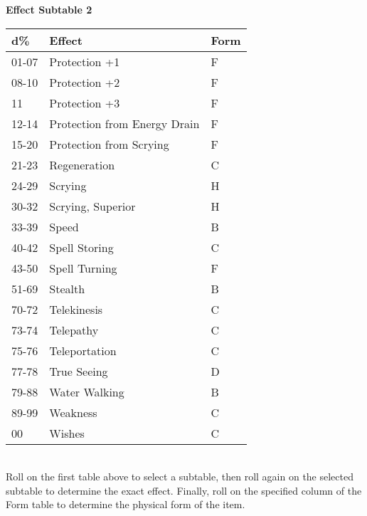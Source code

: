 \documentclass[a4paper,twoside,openany,10pt]{book}
\begin{document}
\begin{multicols}{2}
\textbf{Effect Subtable 2}\medskip

\begin{tabular*}{0.93\linewidth}{@{\extracolsep{\fill}}lll}
d\% & Effect & Form \\\toprule
01-07 & Protection +1 & F \\\hline
08-10 & Protection +2 & F \\\hline
11 & Protection +3 & F \\\hline
12-14 & Protection from Energy Drain & F \\\hline
15-20 & Protection from Scrying & F \\\hline
21-23 & Regeneration & C \\\hline
24-29 & Scrying & H \\\hline
30-32 & Scrying, Superior & H \\\hline
33-39 & Speed & B \\\hline
40-42 & Spell Storing & C \\\hline
43-50 & Spell Turning & F \\\hline
51-69 & Stealth & B \\\hline
70-72 & Telekinesis & C \\\hline
73-74 & Telepathy & C \\\hline
75-76 & Teleportation & C \\\hline
77-78 & True Seeing & D \\\hline
79-88 & Water Walking & B \\\hline
89-99 & Weakness & C \\\hline
00 & Wishes & C \\\bottomrule
\end{tabular*}\\

Roll on the first table above to select a subtable, then roll again on the selected subtable to determine the exact effect. Finally, roll on the specified column of the Form table to determine the physical form of the item.

\end{multicols}
\end{document}

